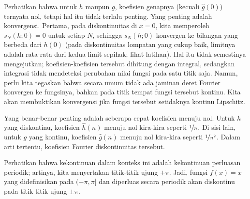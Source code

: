 \begin{example}
\begin{myfigureht}
\caption{Fungsi $h$ dan $g$ dengan garis tebal, disertai beberapa
jumlah parsial simetris berwarna abu-abu.\label{fig:fourierheavicsaw}}
\end{myfigureht}

Perhatikan bahwa untuk $h$ maupun $g$, koefisien genapnya (kecuali $\hat{g}(0)$)
ternyata nol, tetapi hal itu tidak terlalu penting.
Yang penting adalah konvergensi.
Pertama, pada diskontinuitas di $x=0$, kita memperoleh $s_N(h;0) = 0$
untuk setiap $N$, sehingga $s_N(h;0)$ konvergen
ke bilangan yang berbeda dari $h(0)$ (pada diskontinuitas lompatan yang cukup baik,
limitnya adalah rata-rata dari kedua limit sepihak; lihat latihan).
Hal itu tidak semestinya mengejutkan;
koefisien-koefisien tersebut dihitung dengan integral, sedangkan integrasi
tidak mendeteksi perubahan nilai fungsi pada satu titik saja.
Namun, perlu kita tegaskan bahwa secara umum tidak ada jaminan
deret Fourier konvergen ke fungsinya, bahkan pada titik tempat
fungsi tersebut kontinu.
Kita akan membuktikan konvergensi jika fungsi tersebut setidaknya kontinu Lipschitz.

Yang benar-benar penting adalah seberapa cepat koefisien menuju nol. Untuk
$h$ yang diskontinu, koefisien $\hat{h}(n)$ menuju nol kira-kira seperti
$\nicefrac{1}{n}$. Di sisi lain, untuk $g$ yang kontinu,
koefisien $\hat{g}(n)$ menuju nol kira-kira seperti
$\nicefrac{1}{n^2}$.
Dalam arti tertentu, koefisien Fourier 
diskontinuitas tersebut.

Perhatikan bahwa kekontinuan dalam konteks ini adalah kekontinuan
perluasan periodik; artinya, kita menyertakan titik-titik ujung $\pm \pi$.
Jadi, fungsi $f(x) = x$ yang didefinisikan pada $(-\pi,\pi]$
dan diperluas secara periodik akan diskontinu pada titik-titik ujung $\pm\pi$.
\end{example}

